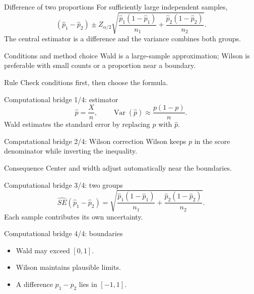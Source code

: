 \documentclass[10pt,aspectratio=169]{beamer}
\begin{document}
\begin{frame}{Difference of two proportions}
  \footnotesize
  For sufficiently large independent samples,
  \[
    (\hat p_1-\hat p_2)\pm Z_{\alpha/2}
    \sqrt{\frac{\hat p_1(1-\hat p_1)}{n_1}+
    \frac{\hat p_2(1-\hat p_2)}{n_2}}.
  \]
  The central estimator is a difference and the variance combines both groups.
\end{frame}

\begin{frame}{Conditions and method choice}
  \footnotesize
  Wald is a large-sample approximation; Wilson is preferable with small counts
  or a proportion near a boundary.
  \begin{alertblock}{Rule}
    Check conditions first, then choose the formula.
  \end{alertblock}
\end{frame}

\begin{frame}{Computational bridge 1/4: estimator}
  \footnotesize
  \[
    \hat p=\frac{X}{n},\qquad
    \operatorname{Var}(\hat p)\approx\frac{p(1-p)}{n}.
  \]
  Wald estimates the standard error by replacing $p$ with $\hat p$.
\end{frame}

\begin{frame}{Computational bridge 2/4: Wilson correction}
  \footnotesize
  Wilson keeps $p$ in the score denominator while inverting the inequality.
  \begin{block}{Consequence}
    Center and width adjust automatically near the boundaries.
  \end{block}
\end{frame}

\begin{frame}{Computational bridge 3/4: two groups}
  \footnotesize
  \[
    \widehat{SE}(\hat p_1-\hat p_2)=
    \sqrt{\frac{\hat p_1(1-\hat p_1)}{n_1}+
    \frac{\hat p_2(1-\hat p_2)}{n_2}}.
  \]
  Each sample contributes its own uncertainty.
\end{frame}

\begin{frame}{Computational bridge 4/4: boundaries}
  \footnotesize
  \begin{itemize}\itemsep=0.12cm
    \item Wald may exceed $[0,1]$.
    \item Wilson maintains plausible limits.
    \item A difference $p_1-p_2$ lies in $[-1,1]$.
  \end{itemize}
\end{frame}
\end{document}
